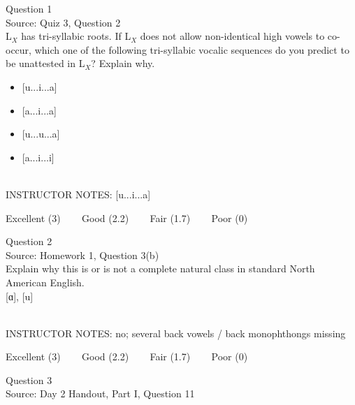 \documentclass[12pt]{article}
\begin{document}
\begin{center}
\textbf{{\color{blue}{\HUGE START OF EXAM\\}}}

\textbf{{\color{blue}{\HUGE Student ID: 9918\\}}}

\textbf{{\color{blue}{\HUGE 4:30 - 4:45 PM\\}}}

\end{center}
\newpage

{\large Question 1}\\

Source: Quiz 3, Question 2\\

L$_X$ has tri-syllabic roots. If L$_X$ does not allow non-identical high vowels to co-occur, which one of the following tri-syllabic vocalic sequences do you predict to be unattested in L$_X$? Explain why.\\

\begin{itemize} \item {[u...i...a]} \item {[a...i...a]} \item {[u...u...a]} \item {[a...i...i]} \end{itemize}


~\\
INSTRUCTOR NOTES: [u...i...a]


\vfill
Excellent (3) ~~~ Good (2.2) ~~~ Fair (1.7) ~~~ Poor (0)
\newpage

{\large Question 2}\\

Source: Homework 1, Question 3(b)\\

Explain why this is or is not a complete natural class in standard North American English.\\

{[ɑ]}, {[u]}


~\\
INSTRUCTOR NOTES: no; several back vowels / back monophthongs missing


\vfill
Excellent (3) ~~~ Good (2.2) ~~~ Fair (1.7) ~~~ Poor (0)
\newpage

{\large Question 3}\\

Source: Day 2 Handout, Part I, Question 11\\
\end{document}

